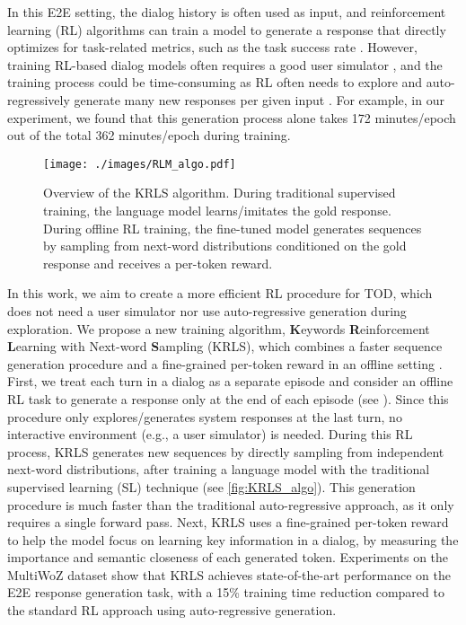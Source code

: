 In this E2E setting, the dialog history is often used as input, and reinforcement learning (RL) algorithms can train a model to generate a response that directly optimizes for task-related metrics, such as the task success rate \cite{multiwoz}.
However, training RL-based dialog models often requires a good user simulator \cite{user-simulator}, and the training process could be time-consuming as RL often needs to explore and auto-regressively generate many new responses per given input \cite{rl4lm}.
For example, in our experiment, we found that this generation process alone takes 172 minutes/epoch out of the total 362 minutes/epoch during training. 
\begin{figure*}[!ht]
    \centering
    \texttt{[image: ./images/RLM\_algo.pdf]}
    \caption{Overview of the KRLS algorithm. During traditional supervised training, the language model learns/imitates the gold response. During offline RL training, the fine-tuned model generates sequences by sampling from next-word distributions conditioned on the gold response and receives a per-token reward.}
    \label{fig:KRLS_algo}
\end{figure*}

In this work, we aim to create a more efficient RL procedure for TOD, which does not need a user simulator nor use auto-regressive generation during exploration. We propose a new training algorithm, \textbf{K}eywords \textbf{R}einforcement \textbf{L}earning with Next-word \textbf{S}ampling (KRLS), which combines a faster sequence generation procedure and a fine-grained per-token reward in an offline setting \cite{way-off-policy, GOLD}. 
First, we treat each turn in a dialog as a separate episode and consider an offline RL task to generate a response only at the end of each episode (see ). 
Since this procedure only explores/generates system responses at the last turn, no interactive environment (e.g., a user simulator) is needed.
During this RL process, KRLS generates new sequences by directly sampling from independent next-word distributions, after training a language model with the traditional supervised learning (SL) technique (see \autoref{fig:KRLS_algo}). %
This generation procedure is much faster than the traditional auto-regressive approach, as it only requires a single forward pass. 
Next, KRLS uses a fine-grained per-token reward to help the model focus on learning key information in a dialog, by measuring the importance and semantic closeness of each generated token.
Experiments on the MultiWoZ dataset show that KRLS achieves state-of-the-art performance on the E2E response generation task, with a 15\% training time reduction compared to the standard RL approach using auto-regressive generation.

